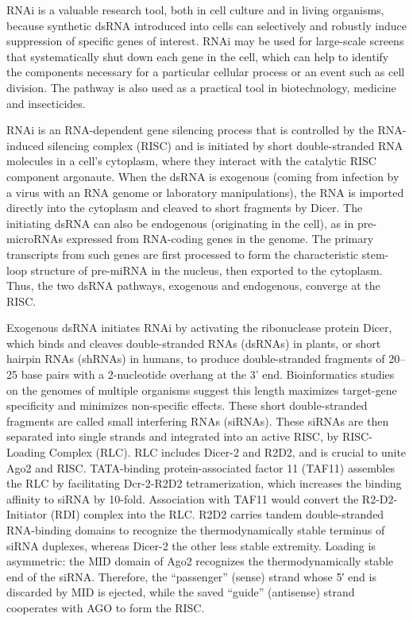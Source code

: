 RNAi is a valuable research tool, both in cell culture and in living organisms, because synthetic dsRNA introduced into cells can selectively and robustly induce suppression of specific genes of interest. RNAi may be used for large-scale screens that systematically shut down each gene in the cell, which can help to identify the components necessary for a particular cellular process or an event such as cell division. The pathway is also used as a practical tool in biotechnology, medicine and insecticides.

RNAi is an RNA-dependent gene silencing process that is controlled by the RNA-induced silencing complex (RISC) and is initiated by short double-stranded RNA molecules in a cell's cytoplasm, where they interact with the catalytic RISC component argonaute. When the dsRNA is exogenous (coming from infection by a virus with an RNA genome or laboratory manipulations), the RNA is imported directly into the cytoplasm and cleaved to short fragments by Dicer. The initiating dsRNA can also be endogenous (originating in the cell), as in pre-microRNAs expressed from RNA-coding genes in the genome. The primary transcripts from such genes are first processed to form the characteristic stem-loop structure of pre-miRNA in the nucleus, then exported to the cytoplasm. Thus, the two dsRNA pathways, exogenous and endogenous, converge at the RISC.

Exogenous dsRNA initiates RNAi by activating the ribonuclease protein Dicer, which binds and cleaves double-stranded RNAs (dsRNAs) in plants, or short hairpin RNAs (shRNAs) in humans, to produce double-stranded fragments of 20--25 base pairs with a 2-nucleotide overhang at the 3' end. Bioinformatics studies on the genomes of multiple organisms suggest this length maximizes target-gene specificity and minimizes non-specific effects. These short double-stranded fragments are called small interfering RNAs (siRNAs). These siRNAs are then separated into single strands and integrated into an active RISC, by RISC-Loading Complex (RLC). RLC includes Dicer-2 and R2D2, and is crucial to unite Ago2 and RISC. TATA-binding protein-associated factor 11 (TAF11) assembles the RLC by facilitating Dcr-2-R2D2 tetramerization, which increases the binding affinity to siRNA by 10-fold. Association with TAF11 would convert the R2-D2-Initiator (RDI) complex into the RLC. R2D2 carries tandem double-stranded RNA-binding domains to recognize the thermodynamically stable terminus of siRNA duplexes, whereas Dicer-2 the other less stable extremity. Loading is asymmetric: the MID domain of Ago2 recognizes the thermodynamically stable end of the siRNA. Therefore, the ``passenger'' (sense) strand whose 5′ end is discarded by MID is ejected, while the saved ``guide'' (antisense) strand cooperates with AGO to form the RISC.


